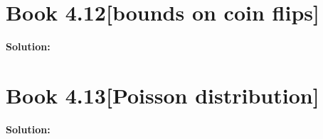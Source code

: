 \documentclass[11pt]{article}
\newenvironment{question}[2]
{\newpage\section{#1\texorpdfstring{\hfill}{horizontal spacing}{\rm\normalsize #2}}}{}
\newenvironment{solution}
{\textbf{Solution: }\color{blue}}
{\color{black}}
\begin{document}

\begin{question}{Book 4.12}{[bounds on coin flips]}


\begin{solution}

\end{solution}
\end{question}


\begin{question}{Book 4.13}{[Poisson distribution]}


\begin{solution}

\end{solution}
\end{question}

\end{document}
